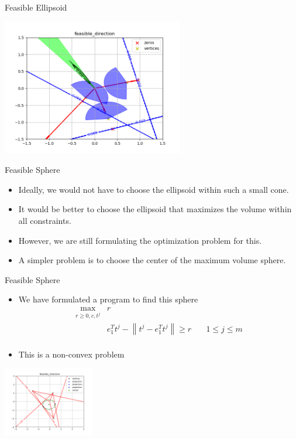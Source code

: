 \documentclass{beamer}
\begin{document}
\begin{frame}{Feasible Ellipsoid}
	\begin{center}
		\includegraphics[width=300px]{images/feasible_direction.png}
	\end{center}
\end{frame}


\begin{frame}{Feasible Sphere}

\begin{itemize}
	\item Ideally, we would not have to choose the ellipsoid within such a small cone.
	\item It would be better to choose the ellipsoid that maximizes the volume within all constraints.
	\item However, we are still formulating the optimization problem for this.
	\item A simpler problem is to choose the center of the maximum volume sphere.
\end{itemize}
\end{frame}

\begin{frame}{Feasible Sphere}
\begin{itemize}
	\item We have formulated a program to find this sphere
		\begin{align*}
\max_{r \ge 0, c, t^j}	& r & \\
					&  e_1^T t^j - \left\|t^j - e_1^T t^j\right\| \ge r			& \quad 1 \le j \le m \\
		\end{align*}
	\item This is a non-convex problem
\end{itemize}
\begin{center}
\includegraphics[width=150px]{images/feasible_sphere.png}
\end{center}
\end{frame}
\end{document}
